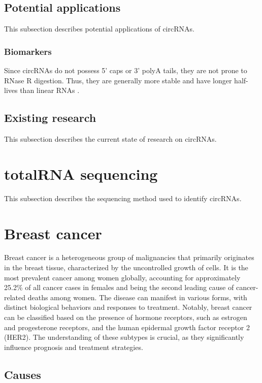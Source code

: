 \subsection{Potential applications}
This subsection describes potential applications of circRNAs.

\subsubsection{Biomarkers}
Since circRNAs do not possess 5' caps or 3' polyA tails, they are not prone to
RNase R digestion. Thus, they are generally more stable and have longer
half-lives than linear RNAs \supercite{kristensen_biogenesis_2019}.

\subsection{Existing research}
This subsection describes the current state of research on circRNAs.

\section{totalRNA sequencing}
This subsection describes the sequencing method used to identify circRNAs.

\lipsum[2]

\section{Breast cancer}
Breast cancer is a heterogeneous group of malignancies that primarily originates
in the breast tissue, characterized by the uncontrolled growth of cells. It is
the most prevalent cancer among women globally, accounting for approximately
25.2\% of all cancer cases in females and being the second leading cause of
cancer-related deaths among women\supercite{pace_breast_2016}. The disease can
manifest in various forms, with distinct biological behaviors and responses to
treatment. Notably, breast cancer can be classified based on the presence of
hormone receptors, such as estrogen and progesterone receptors, and the human
epidermal growth factor receptor 2 (HER2)\supercite{eccles_critical_2013}. The
understanding of these subtypes is crucial, as they significantly influence
prognosis and treatment strategies.

\subsection{Causes}

